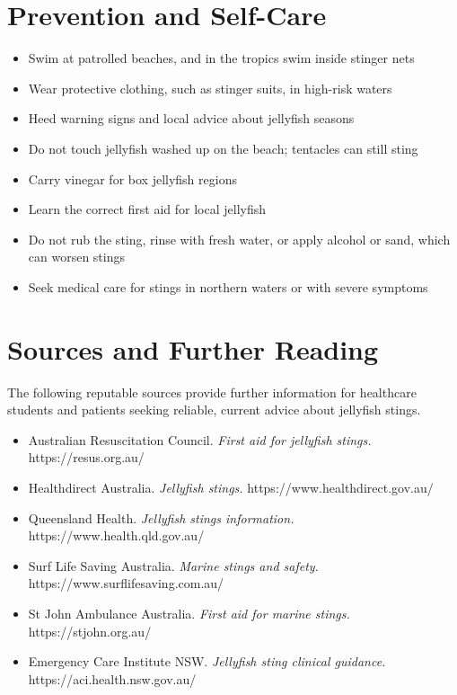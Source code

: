 \section*{Prevention and Self-Care}
\begin{itemize}
    \item Swim at patrolled beaches, and in the tropics swim inside stinger nets
    \item Wear protective clothing, such as stinger suits, in high-risk waters
    \item Heed warning signs and local advice about jellyfish seasons
    \item Do not touch jellyfish washed up on the beach; tentacles can still sting
    \item Carry vinegar for box jellyfish regions
    \item Learn the correct first aid for local jellyfish
    \item Do not rub the sting, rinse with fresh water, or apply alcohol or sand, which can worsen stings
    \item Seek medical care for stings in northern waters or with severe symptoms
\end{itemize}

\section*{Sources and Further Reading}
The following reputable sources provide further information for healthcare students and patients seeking reliable, current advice about jellyfish stings.
\begin{itemize}
    \item Australian Resuscitation Council. \textit{First aid for jellyfish stings.} https://resus.org.au/
    \item Healthdirect Australia. \textit{Jellyfish stings.} https://www.healthdirect.gov.au/
    \item Queensland Health. \textit{Jellyfish stings information.} https://www.health.qld.gov.au/
    \item Surf Life Saving Australia. \textit{Marine stings and safety.} https://www.surflifesaving.com.au/
    \item St John Ambulance Australia. \textit{First aid for marine stings.} https://stjohn.org.au/
    \item Emergency Care Institute NSW. \textit{Jellyfish sting clinical guidance.} https://aci.health.nsw.gov.au/
\end{itemize}
